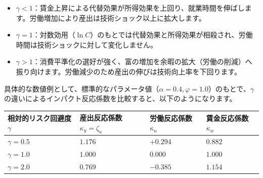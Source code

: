 \documentclass[
  japanese,
  lualatex,
  ja=standard,
  12pt,
  a4paper]{ltjsarticle}
\newcounter{none} %
\providecommand{\tightlist}{%
  \setlength{\itemsep}{0pt}\setlength{\parskip}{0pt}}
\begin{document}
\begin{itemize}
\tightlist
\item
  \textbf{\(\gamma<1\)}：賃金上昇による代替効果が所得効果を上回り、就業時間を伸ばします。労働増加により産出は技術ショック以上に拡大します。
\item
  \textbf{\(\gamma=1\)}：対数効用（\(\ln C\)）のもとでは代替効果と所得効果が相殺され、労働時間は技術ショックに対して変化しません。
\item
  \textbf{\(\gamma>1\)}：消費平準化の選好が強く、富の増加を余暇の拡大（労働の削減）へ振り向けます。労働減少のため産出の伸びは技術向上率を下回ります。
\end{itemize}

具体的な数値例として、標準的なパラメータ値（\(\alpha = 0.4, \varphi = 1.0\)）のもとで、\(\gamma\)
の違いによるインパクト反応係数を比較すると、以下のようになります。

{\def\LTcaptype{none} %
\begin{longtable}[]{@{}
  >{\raggedleft\arraybackslash}p{}
  >{\raggedleft\arraybackslash}p{}
  >{\raggedleft\arraybackslash}p{}
  >{\raggedleft\arraybackslash}p{}@{}}
\toprule\noalign{}
\begin{minipage}[b]{\linewidth}\raggedleft
相対的リスク回避度 \(\gamma\)
\end{minipage} & \begin{minipage}[b]{\linewidth}\raggedleft
産出反応係数 \(\kappa_y = \zeta_a\)
\end{minipage} & \begin{minipage}[b]{\linewidth}\raggedleft
労働反応係数 \(\kappa_n\)
\end{minipage} & \begin{minipage}[b]{\linewidth}\raggedleft
賃金反応係数 \(\kappa_w\)
\end{minipage} \\
\midrule\noalign{}
\endhead
\bottomrule\noalign{}
\endlastfoot
\textbf{\(\gamma = 0.5\)} & \(1.176\) & \(+0.294\) & \(0.882\) \\
\textbf{\(\gamma = 1.0\)} & \(1.000\) & \(0.000\) & \(1.000\) \\
\textbf{\(\gamma = 2.0\)} & \(0.769\) & \(-0.385\) & \(1.154\) \\
\end{longtable}
}

\end{document}
